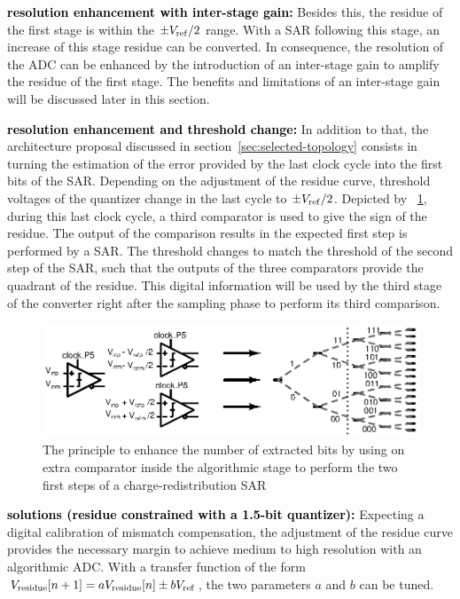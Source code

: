 \textbf{\textcolor{black}{resolution enhancement with inter-stage gain:}}
Besides this, the residue of the first stage is within the $\pm V_{\rm ref}/2$ range. With a SAR following this stage, an increase of this stage residue can be converted. In consequence, the resolution of the ADC can be enhanced by the introduction of an inter-stage gain to amplify the residue of the first stage. The benefits and limitations of an inter-stage gain will be discussed later in this section.

\textbf{\textcolor{black}{resolution enhancement and threshold change:}}
In addition to that, the architecture proposal discussed in section~\ref{sec:selected-topology} consists in turning the estimation of the error provided by the last clock cycle into the first bits of the SAR. Depending on the adjustment of the residue curve, threshold voltages of the quantizer change in the last cycle to \(\pm V_{\rm ref}/2\). Depicted by \figurename~\ref{fig:sar-first-bits-from-algo}, during this last clock cycle, a third comparator is used to give the sign of the residue. The output of the comparison results in the expected first step is performed by a SAR\@. The threshold changes to match the threshold of the second step of the SAR, such that the outputs of the three comparators provide the quadrant of the residue. This digital information will be used by the third stage of the converter right after the sampling phase to perform its third comparison.

\begin{figure}[htp]
	\centering
	\includegraphics[width=\textwidth]{Chapter4/Figs/algo_sar_first_bits.ps}
	\caption{The principle to enhance the number of extracted bits by using on extra comparator inside the algorithmic stage to perform the two first steps of a charge-redistribution SAR}
	\label{fig:sar-first-bits-from-algo}
\end{figure}

\textbf{\textcolor{black}{solutions (residue constrained with a 1.5-bit quantizer):}}
Expecting a digital calibration of mismatch compensation, the adjustment of the residue curve provides the necessary margin to achieve medium to high resolution with an algorithmic ADC\@. With a transfer function of the form $V_{\rm residue}[n+1] = a V_{\rm residue}[n] \pm b V_{\rm ref}$, the two parameters $a$ and $b$ can be tuned.

